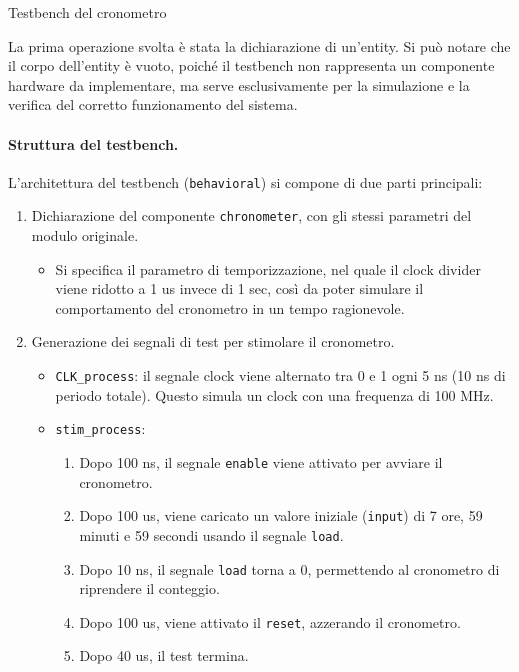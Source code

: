 \begin{code}
    \inputminted{vhdl}{vhdl/chronometer_tb.vhd}
    \caption{Testbench del cronometro}
    \label{cod:chronometer_tb}
\end{code}

La prima operazione svolta è stata la dichiarazione di un’entity. Si può notare che il corpo dell’entity è vuoto, poiché il testbench non rappresenta un componente hardware da implementare, ma serve esclusivamente per la simulazione e la verifica del corretto funzionamento del sistema.

\paragraph{Struttura del testbench.}
L'architettura del testbench (\texttt{behavioral}) si compone di due parti principali:

\begin{enumerate}
    \item Dichiarazione del componente \texttt{chronometer}, con gli stessi parametri del modulo originale.
    \begin{itemize}
        \item Si specifica il parametro di temporizzazione, nel quale il clock divider viene ridotto a 1 us invece di 1 sec, così da poter simulare il comportamento del cronometro in un tempo ragionevole.
    \end{itemize}
    \item Generazione dei segnali di test per stimolare il cronometro.
    \begin{itemize}
        \item \texttt{CLK\_process}: il segnale clock viene alternato tra 0 e 1 ogni 5 ns (10 ns di periodo totale). Questo simula un clock con una frequenza di 100 MHz.
        \item \texttt{stim\_process}:
        \begin{enumerate}
            \item Dopo 100 ns, il segnale \texttt{enable} viene attivato per avviare il cronometro.
            \item Dopo 100 us, viene caricato un valore iniziale (\texttt{input}) di 7 ore, 59 minuti e 59 secondi usando il segnale \texttt{load}.
            \item Dopo 10 ns, il segnale \texttt{load} torna a 0, permettendo al cronometro di riprendere il conteggio.
            \item Dopo 100 us, viene attivato il \texttt{reset}, azzerando il cronometro.
            \item Dopo 40 us, il test termina.
        \end{enumerate}
    \end{itemize}
\end{enumerate}

